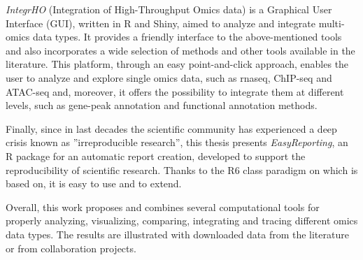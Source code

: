 {\textit{IntegrHO} (Integration of High-Throughput Omics data) is a Graphical User Interface (GUI), written in R and Shiny, aimed to analyze and integrate multi-omics data types. It provides a friendly interface to the above-mentioned tools and also incorporates a wide selection of methods and other tools available in the literature. This platform, through an easy point-and-click approach, enables the user to analyze and explore single omics data, such as \gls{rnaseq}, ChIP-seq and ATAC-seq and, moreover, it offers the possibility to integrate them at different levels, such as gene-peak annotation and functional annotation methods.

Finally, since in last decades the scientific community has experienced a deep crisis known as ''irreproducible research'', this thesis presents \textit{EasyReporting}, an R package for an automatic report creation, developed to support the reproducibility of scientific research.  
Thanks to the R6 class paradigm on which is based on, it is easy to use and to extend.

Overall, this work proposes and combines several computational tools for properly analyzing, visualizing, comparing, integrating and tracing different omics data types. 
The results are illustrated with downloaded data from the literature or from collaboration projects.
}